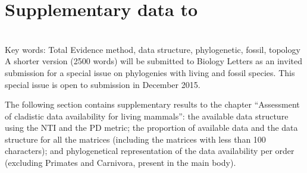 %
%

\chapter{Supplementary data to }
\label{chap:Appendix_missing_mammals}

\bigskip
\medskip
\begin{center}

 \\
\medskip
\noindent Key words: Total Evidence method, data structure, phylogenetic, fossil, topology\\
\bigskip
\noindent A shorter version (2500 words) will be submitted to Biology Letters as an invited submission for a special issue on phylogenies with living and fossil species. This special issue is open to submission in December 2015.\\

\end{center}
%
%
The following section contains supplementary results to the chapter ``Assessment of cladistic data availability for living mammals'': the available data structure using the NTI and the PD metric; the proportion of available data and the data structure for all the matrices (including the matrices with less than 100 characters); and phylogenetical representation of the data availability per order (excluding Primates and Carnivora, present in the main body).



